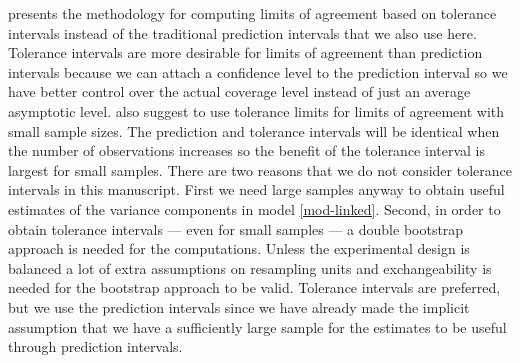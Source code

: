 \documentclass[aoas]{imsart}
\begin{document}
\citet{Choud2008} presents the methodology for computing limits of
agreement based on tolerance intervals instead of the traditional
prediction intervals that we also use here. Tolerance intervals are
more desirable for limits of agreement than prediction intervals
because we can attach a confidence level to the prediction interval so
we have better control over the actual coverage level instead of just
an average asymptotic level.  \citet{Bland:Altman.1999} also suggest
to use tolerance limits for limits of agreement with small sample
sizes. The prediction and tolerance intervals will be identical when
the number of observations increases so the benefit of the tolerance
interval is largest for small samples. There are two reasons that we
do not consider tolerance intervals in this manuscript. First we need
large samples anyway to obtain useful estimates of the variance
components in model \eqref{mod-linked}.  Second, in order to obtain
tolerance intervals --- even for small samples --- a double bootstrap
approach is needed for the computations. Unless the experimental
design is balanced a lot of extra assumptions on resampling units and
exchangeability is needed for the bootstrap approach to be
valid. Tolerance intervals are preferred, but we use the prediction
intervals since we have already made the implicit assumption that we
have a sufficiently large sample for the estimates to be useful
through prediction intervals.




\end{document}
